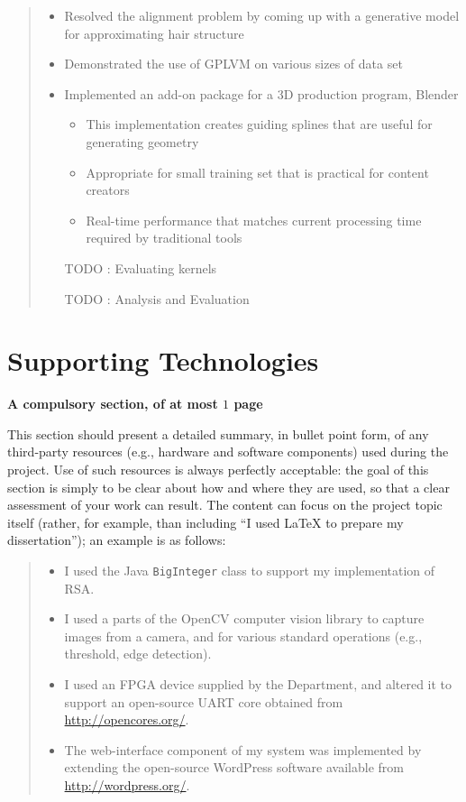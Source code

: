 \documentclass[ %
                    author={Dillon Keith Diep},
                supervisor={Dr. Carl Henrik Ek},
                    degree={MEng},
                     title={Assisted Content Generation for 3D Hair Geometry},
                  subtitle={[INCOMPLETE DRAFT, CONTAINS NOTES FROM RESEARCH]},
                      type={Research},
                      year={2014} ]{dissertation}
\begin{document}
\begin{quote}
\noindent
\begin{itemize}
\item Resolved the alignment problem by coming up with a generative model for approximating hair structure
\item Demonstrated the use of GPLVM on various sizes of data set
\item Implemented an add-on package for a 3D production program, Blender
	\begin{itemize}
		\item This implementation creates guiding splines that are useful for generating geometry
		\item Appropriate for small training set that is practical for content creators
		\item Real-time performance that matches current processing time required by traditional tools
	\end{itemize}
\item [TODO]: Evaluating kernels
\item [TODO]: Analysis and Evaluation
\end{itemize}
\end{quote}


\chapter*{Supporting Technologies}

{\bf A compulsory section, of at most $1$ page}
\vspace{1cm} 

\noindent
This section should present a detailed summary, in bullet point form, 
of any third-party resources (e.g., hardware and software components) 
used during the project.  Use of such resources is always perfectly 
acceptable: the goal of this section is simply to be clear about how
and where they are used, so that a clear assessment of your work can
result.  The content can focus on the project topic itself (rather,
for example, than including ``I used \mbox{\LaTeX} to prepare my 
dissertation''); an example is as follows:

\begin{quote}
\noindent
\begin{itemize}
\item I used the Java {\tt BigInteger} class to support my implementation 
      of RSA.
\item I used a parts of the OpenCV computer vision library to capture 
      images from a camera, and for various standard operations (e.g., 
      threshold, edge detection).
\item I used an FPGA device supplied by the Department, and altered it 
      to support an open-source UART core obtained from 
      \url{http://opencores.org/}.
\item The web-interface component of my system was implemented by 
      extending the open-source WordPress software available from
      \url{http://wordpress.org/}.
\end{itemize}
\end{quote}
\end{document}
